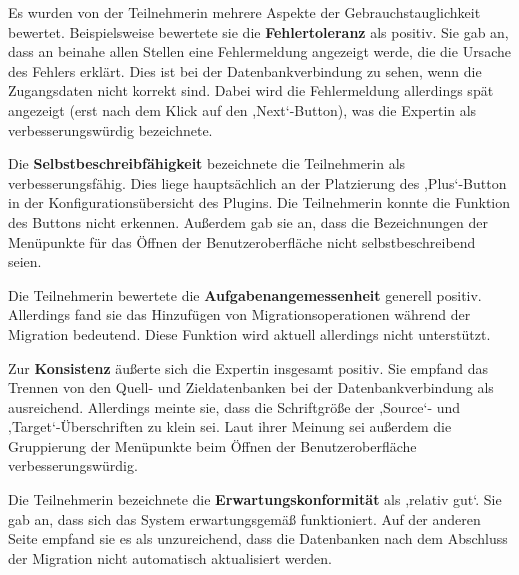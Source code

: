 Es wurden von der Teilnehmerin mehrere Aspekte der Gebrauchstauglichkeit bewertet. Beispielsweise bewertete sie die \textbf{Fehlertoleranz} als positiv. Sie gab an, dass an beinahe allen Stellen eine Fehlermeldung angezeigt werde, die die Ursache des Fehlers erklärt. Dies ist bei der Datenbankverbindung zu sehen, wenn die Zugangsdaten nicht korrekt sind. Dabei wird die Fehlermeldung allerdings spät angezeigt (erst nach dem Klick auf den ,Next‘-Button), was die Expertin als verbesserungswürdig bezeichnete.

Die \textbf{Selbstbeschreibfähigkeit} bezeichnete die Teilnehmerin als verbesserungsfähig. Dies liege hauptsächlich an der Platzierung des ,Plus‘-Button in der Konfigurationsübersicht des Plugins. Die Teilnehmerin konnte die Funktion des Buttons nicht erkennen. Außerdem gab sie an, dass die Bezeichnungen der Menüpunkte für das Öffnen der Benutzeroberfläche nicht selbstbeschreibend seien.

Die Teilnehmerin bewertete die \textbf{Aufgabenangemessenheit} generell positiv. Allerdings fand sie das Hinzufügen von Migrationsoperationen während der Migration bedeutend. Diese Funktion wird aktuell allerdings nicht unterstützt.

Zur \textbf{Konsistenz} äußerte sich die Expertin insgesamt positiv. Sie empfand das Trennen von den Quell- und Zieldatenbanken bei der Datenbankverbindung als ausreichend. Allerdings meinte sie, dass die Schriftgröße der ,Source‘- und ‚Target‘-Überschriften zu klein sei. Laut ihrer Meinung sei außerdem die Gruppierung der Menüpunkte beim Öffnen der Benutzeroberfläche verbesserungswürdig.

Die Teilnehmerin bezeichnete die \textbf{Erwartungskonformität} als ,relativ gut‘. Sie gab an, dass sich das System erwartungsgemäß funktioniert. Auf der anderen Seite empfand sie es als unzureichend, dass die Datenbanken nach dem Abschluss der Migration nicht automatisch aktualisiert werden.


